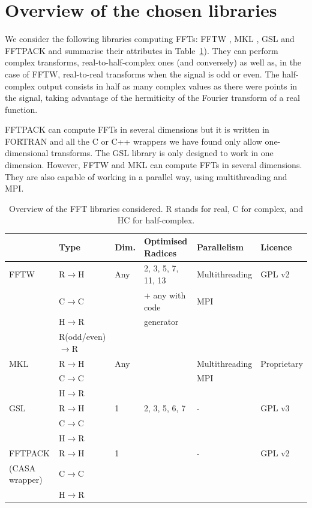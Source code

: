 \documentclass[12pt, a4paper]{article} \setlength{\textheight}{24cm}
\begin{document}
\section{Overview of the chosen libraries}
We consider the following libraries computing FFTs: FFTW \cite{fftw},
MKL \cite{mkl}, GSL \cite{gsl} and FFTPACK \cite{fftpack} and
summarise their attributes in Table~\ref{ffttable}). They can perform
complex transforms, real-to-half-complex ones (and conversely) as well
as, in the case of FFTW, real-to-real transforms when the signal is
odd or even. The half-complex output consists in half as many complex
values as there were points in the signal, taking advantage of the
hermiticity of the Fourier transform of a real function.

FFTPACK can compute FFTs in several dimensions but it is written in
FORTRAN and all the C or C++ wrappers we have found only allow
one-dimensional transforms. The GSL library is only designed to work
in one dimension. However, FFTW and MKL can compute FFTs in several
dimensions. They are also capable of working in a parallel way, using
multithreading and MPI.
\begin{table}[H]
  \begin{tabular}{|l||l|l|l|l|l|}
    \hline
    & Type & Dim. & Optimised Radices & Parallelism & Licence \\
    \hline
    \hline
    FFTW & R$\to$H & Any & 2, 3, 5, 7, 11, 13  & Multithreading  & GPL v2\\
    & C$\to$C & & + any with code & MPI &  \\
    &  H$\to$R & &  generator & &  \\
    & R{\scriptsize (odd/even)}$\to$R & & & &  \\
    \hline
    MKL  &  R$\to$H & Any & & Multithreading & Proprietary\\
    & C$\to$C & & & MPI &  \\
    &  H$\to$R & & & &  \\
    \hline
    GSL  &  R$\to$H & 1 & 2, 3, 5, 6, 7 & - & GPL v3\\
    & C$\to$C & & & &  \\
    &  H$\to$R & & & &  \\
    \hline
    FFTPACK  &  R$\to$H  & 1 & & - & GPL v2\\
    {\scriptsize (CASA wrapper)} & C$\to$C & & & &  \\
    &  H$\to$R & & & &  \\
    \hline
  \end{tabular}
  \caption{Overview of the FFT libraries considered. R stands for real, C for complex, and HC for half-complex.}
  \label{ffttable}
\end{table}
\end{document}

